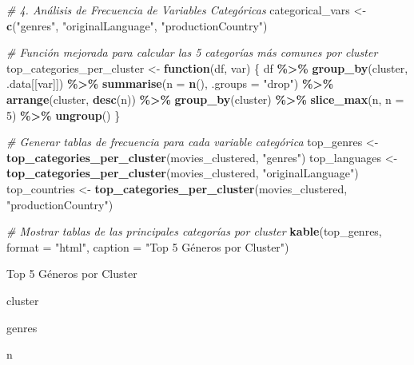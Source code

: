 \documentclass[
]{article}
\newenvironment{Shaded}{\begin{snugshade}}{\end{snugshade}}
\newcommand{\AttributeTok}[1]{\textcolor[rgb]{0.13,0.29,0.53}{#1}}
\newcommand{\CommentTok}[1]{\textcolor[rgb]{0.56,0.35,0.01}{\textit{#1}}}
\newcommand{\ControlFlowTok}[1]{\textcolor[rgb]{0.13,0.29,0.53}{\textbf{#1}}}
\newcommand{\DecValTok}[1]{\textcolor[rgb]{0.00,0.00,0.81}{#1}}
\newcommand{\FunctionTok}[1]{\textcolor[rgb]{0.13,0.29,0.53}{\textbf{#1}}}
\newcommand{\NormalTok}[1]{#1}
\newcommand{\OtherTok}[1]{\textcolor[rgb]{0.56,0.35,0.01}{#1}}
\newcommand{\SpecialCharTok}[1]{\textcolor[rgb]{0.81,0.36,0.00}{\textbf{#1}}}
\newcommand{\StringTok}[1]{\textcolor[rgb]{0.31,0.60,0.02}{#1}}
\begin{document}
\begin{Shaded}
\begin{Highlighting}[]
\CommentTok{\# 4. Análisis de Frecuencia de Variables Categóricas}
\NormalTok{categorical\_vars }\OtherTok{\textless{}{-}} \FunctionTok{c}\NormalTok{(}\StringTok{"genres"}\NormalTok{, }\StringTok{"originalLanguage"}\NormalTok{, }\StringTok{"productionCountry"}\NormalTok{)}

\CommentTok{\# Función mejorada para calcular las 5 categorías más comunes por cluster}
\NormalTok{top\_categories\_per\_cluster }\OtherTok{\textless{}{-}} \ControlFlowTok{function}\NormalTok{(df, var) \{}
\NormalTok{  df }\SpecialCharTok{\%\textgreater{}\%}
    \FunctionTok{group\_by}\NormalTok{(cluster, .data[[var]]) }\SpecialCharTok{\%\textgreater{}\%}
    \FunctionTok{summarise}\NormalTok{(}\AttributeTok{n =} \FunctionTok{n}\NormalTok{(), }\AttributeTok{.groups =} \StringTok{"drop"}\NormalTok{) }\SpecialCharTok{\%\textgreater{}\%}
    \FunctionTok{arrange}\NormalTok{(cluster, }\FunctionTok{desc}\NormalTok{(n)) }\SpecialCharTok{\%\textgreater{}\%}
    \FunctionTok{group\_by}\NormalTok{(cluster) }\SpecialCharTok{\%\textgreater{}\%}
    \FunctionTok{slice\_max}\NormalTok{(n, }\AttributeTok{n =} \DecValTok{5}\NormalTok{) }\SpecialCharTok{\%\textgreater{}\%}
    \FunctionTok{ungroup}\NormalTok{()}
\NormalTok{\}}

\CommentTok{\# Generar tablas de frecuencia para cada variable categórica}
\NormalTok{top\_genres }\OtherTok{\textless{}{-}} \FunctionTok{top\_categories\_per\_cluster}\NormalTok{(movies\_clustered, }\StringTok{"genres"}\NormalTok{)}
\NormalTok{top\_languages }\OtherTok{\textless{}{-}} \FunctionTok{top\_categories\_per\_cluster}\NormalTok{(movies\_clustered, }\StringTok{"originalLanguage"}\NormalTok{)}
\NormalTok{top\_countries }\OtherTok{\textless{}{-}} \FunctionTok{top\_categories\_per\_cluster}\NormalTok{(movies\_clustered, }\StringTok{"productionCountry"}\NormalTok{)}

\CommentTok{\# Mostrar tablas de las principales categorías por cluster}
\FunctionTok{kable}\NormalTok{(top\_genres, }\AttributeTok{format =} \StringTok{"html"}\NormalTok{, }\AttributeTok{caption =} \StringTok{"Top 5 Géneros por Cluster"}\NormalTok{)}
\end{Highlighting}
\end{Shaded}

Top 5 Géneros por Cluster

cluster

genres

n
\end{document}

